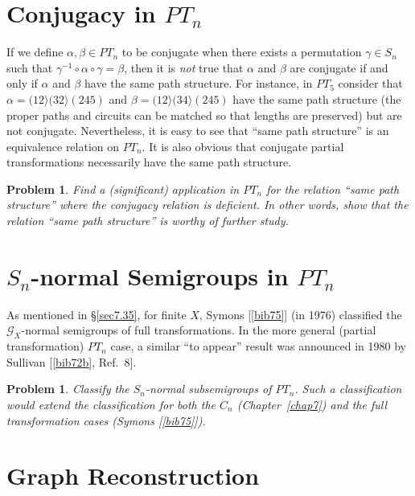\documentclass{surv-l}
\numberwithin{equation}{section}
\numberwithin{table}{section}
\numberwithin{figure}{section}
\theoremstyle{plain}
\newtheorem{problem}[equation]{Problem}
\theoremstyle{definition}
\begin{document}
\section{Conjugacy in $PT_{n}$}\label{sec13.64}

If we define $\alpha,\beta\in PT_{n}$ to be conjugate when there
exists a permutation $\gamma\in S_{n}$ such that
$\gamma^{-1}\circ\alpha \circ\gamma=\beta$, then it is \emph{not}
true that $\alpha$ and $\beta$ are conjugate if and only if
$\alpha$ and $\beta$ have the same path structure. For instance,
in $PT_{5}$ consider that $\alpha=(12\rangle(32\rangle(245)$ and
$\beta=(12\rangle(34\rangle(245)$ have the same path structure
(the proper paths and circuits can be matched so that lengths are
preserved) but are not conjugate. Nevertheless, it is easy to see
that ``same path structure'' is an equivalence relation on
$PT_{n}$. It is also obvious that conjugate partial
transformations necessarily have the same path structure.

\begin{problem}\label{prob13.64.1}
Find a (significant) application in $PT_{n}$ for the relation
``same path structure'' where the conjugacy relation is deficient.
In other words, show that the relation ``same path structure'' is
worthy of further study.
\end{problem}

\section{$S_{n}$-normal Semigroups in $PT_{n}$}\label{sec13.65}

As mentioned in \S\ref{sec7.35}, for finite $X$,
Symons [\ref{bib75}] (in
1976) classified the $\mathcal{G}_{X}$-normal semigroups of full
transformations. In the more general (partial transformation)
$PT_{n}$ case, a similar ``to appear'' result was announced in
1980 by Sullivan
[\ref{bib72b}, Ref.~8].

\begin{problem}\label{prob13.65.1}
Classify the $S_{n}$-normal subsemigroups of $PT_{n}$. Such a
classification would extend the classification for both the
$C_{n}$ \emph{(Chapter~\ref{chap7})} and the full transformation
cases \emph{(Symons [\ref{bib75}])}.
\end{problem}

\section{Graph Reconstruction}\label{sec13.66}
\end{document}
